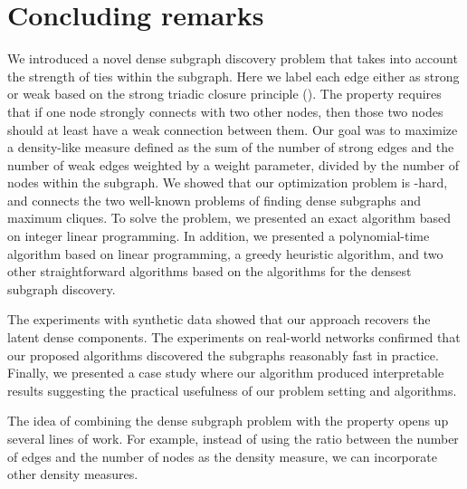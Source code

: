 \section{Concluding remarks}\label{sec:conclusions}

We introduced a novel dense subgraph discovery problem that takes into account the strength of ties within the subgraph.
Here we label each edge either as {strong} or {weak} based on the strong triadic closure principle (\stc). The \stc property requires that if one node {strongly} connects with two other nodes, then those two nodes should at least have a  {weak} connection between them. 
Our goal was to maximize a density-like measure defined as the sum of the number of strong edges and the number of weak edges weighted by a weight parameter, divided by the number of nodes within the subgraph.
We showed that our optimization problem is \np-hard, and connects the two well-known problems of finding dense subgraphs and maximum cliques. To solve the problem, we presented an exact algorithm based on integer linear programming. In addition, we presented a polynomial-time algorithm based on linear programming, a greedy heuristic algorithm, and two other straightforward algorithms based on the algorithms for the densest subgraph discovery.

The experiments with synthetic data showed that our approach recovers the
latent dense components. The experiments on real-world networks confirmed that our
proposed algorithms discovered the subgraphs reasonably fast in practice.
Finally, we presented a case study where our algorithm produced interpretable results suggesting the practical usefulness of our problem setting and algorithms.

The idea of combining the dense subgraph problem
with the \stc property opens up several lines of work. For example, 
instead of using the ratio between the number of edges and the number of nodes as the density measure, we can incorporate other density measures.


